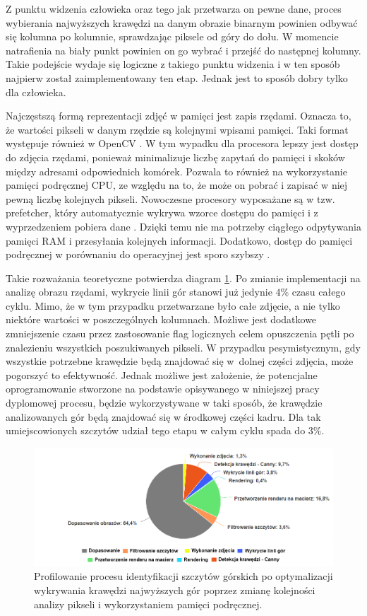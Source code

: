 Z punktu widzenia człowieka oraz tego jak przetwarza on pewne dane, proces wybierania najwyższych krawędzi na danym obrazie binarnym powinien odbywać się kolumna po kolumnie, sprawdzając piksele od góry do dołu. W momencie natrafienia na biały punkt powinien on go wybrać i przejść do następnej kolumny. Takie podejście wydaje się logiczne z takiego punktu widzenia i w ten sposób najpierw został zaimplementowany ten etap. Jednak jest to sposób dobry tylko dla człowieka. 

Najczęstszą formą reprezentacji zdjęć w pamięci jest zapis rzędami. Oznacza to, że wartości pikseli w danym rzędzie są kolejnymi wpisami pamięci. Taki format występuje również w OpenCV \cite{opencv_mat}. W tym wypadku dla procesora lepszy jest dostęp do zdjęcia rzędami, ponieważ minimalizuje liczbę zapytań do pamięci i skoków między adresami odpowiednich komórek. Pozwala to również na wykorzystanie pamięci podręcznej CPU, ze względu na to, że może on pobrać i zapisać w niej pewną liczbę kolejnych pikseli. Nowoczesne procesory wyposażane są w tzw. prefetcher, który automatycznie wykrywa wzorce dostępu do pamięci i z wyprzedzeniem pobiera dane \cite{cache_memory}. Dzięki temu nie ma potrzeby ciągłego odpytywania pamięci RAM i przesyłania kolejnych informacji. Dodatkowo, dostęp do pamięci podręcznej w porównaniu do operacyjnej jest sporo szybszy \cite{memory_hierarchy}.

Takie rozważania teoretyczne potwierdza diagram \ref{fig:profilowanie_po_linia}. Po zmianie implementacji na analizę obrazu rzędami, wykrycie linii gór stanowi już jedynie $4\%$ czasu całego cyklu. Mimo, że w tym przypadku przetwarzane było całe zdjęcie, a nie tylko niektóre wartości w poszczególnych kolumnach. Możliwe jest dodatkowe zmniejszenie czasu przez zastosowanie flag logicznych celem opuszczenia pętli po znalezieniu wszystkich poszukiwanych pikseli. W przypadku pesymistycznym, gdy wszystkie potrzebne krawędzie będą znajdować się w~dolnej części zdjęcia, może pogorszyć to efektywność. Jednak możliwe jest założenie, że potencjalne oprogramowanie stworzone na podstawie opisywanego w niniejszej pracy dyplomowej procesu, będzie wykorzystywane w taki sposób, że krawędzie analizowanych gór będą znajdować się w środkowej części kadru. Dla tak umiejscowionych szczytów udział tego etapu w całym cyklu spada do $3\%$. 

\begin{figure}[!h]
    \centering \includegraphics[width=0.9\linewidth]{img/pie_chart_profilowanie_po_linii.png}
    \caption{Profilowanie procesu identyfikacji szczytów górskich po optymalizacji wykrywania krawędzi najwyższych gór poprzez zmianę kolejności analizy pikseli i wykorzystaniem pamięci podręcznej.}
    \label{fig:profilowanie_po_linia}
\end{figure}


